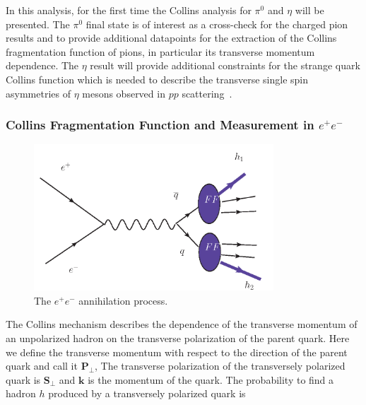  In this analysis, for the first time the Collins analysis for $\pi^{0}$ and $\eta$ will be presented. The $\pi^0$ final state is of interest as a cross-check for the charged pion results and to provide additional datapoints for the extraction of the Collins fragmentation function of pions, in particular its transverse momentum dependence. The $\eta$ result will provide additional constraints for the strange quark Collins function which is needed to describe the transverse single spin asymmetries of $\eta$ mesons observed in $pp$ scattering~\cite{StarTSSA2}\cite{PHENIX}. 


\subsubsection{Collins Fragmentation Function and Measurement in $e^+e^-$}
 \begin{figure}[h]
    \centering
    \includegraphics[width=0.8\textwidth,natwidth=610,natheight=642]{figure_theory/e+e-.png}
    \caption[Short caption]{The $e^+e^-$ annihilation process.}
    \label{fig:e+e-}
\end{figure}
The Collins mechanism describes the dependence of the transverse momentum of an unpolarized hadron on the transverse polarization of the parent quark. Here we define the transverse momentum with respect to the direction of the parent quark and call it $\boldsymbol{P}_{\bot}$, The transverse polarization of the transversely polarized quark is $\boldsymbol{S}_\perp$ and $\boldsymbol{k}$ is the momentum of the quark. The probability to find a hadron $h$ produced by a transversely polarized quark is\cite{ChargedPionResult,SSATrentoConvention}

